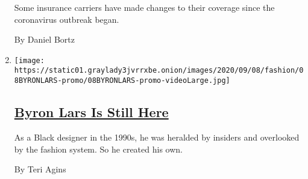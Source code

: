 \begin{enumerate}
  Some insurance carriers have made changes to their coverage since the
  coronavirus outbreak began.

  By Daniel Bortz
\item
  \texttt{[image: https://static01.graylady3jvrrxbe.onion/images/2020/09/08/fashion/08BYRONLARS-promo/08BYRONLARS-promo-videoLarge.jpg]}

  \hypertarget{byron-lars-is-still-here}{%
  \subsection{\texorpdfstring{\href{/2020/09/09/style/fashion-byron-lars-is-still-here.html}{Byron
  Lars Is Still
  Here}}{Byron Lars Is Still Here}}\label{byron-lars-is-still-here}}

  As a Black designer in the 1990s, he was heralded by insiders and
  overlooked by the fashion system. So he created his own.

  By Teri Agins
\end{enumerate}

